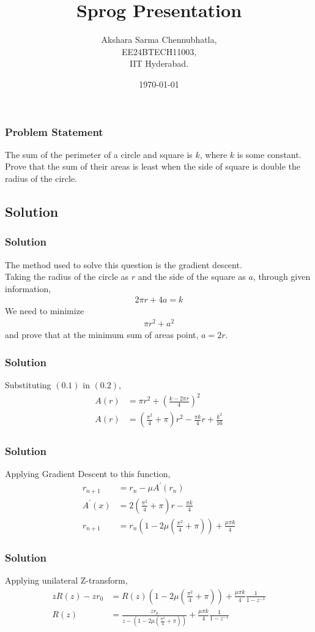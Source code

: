 \documentclass{beamer}
\title{Sprog Presentation}
\author{Akshara Sarma Chennubhatla,\\ EE24BTECH11003,\\IIT Hyderabad.\\}
\date{\today}
\providecommand{\brak}[1]{\ensuremath{\left(#1\right)}}
\theoremstyle{remark}
\numberwithin{equation}{section}
\begin{document}
		\begin{frame}
			\titlepage
		\end{frame}

		\begin{frame}
			\frametitle{Problem Statement}

The sum of the perimeter of a circle and square is $k$, where $k$ is some constant. Prove that the sum of their areas is least when the side of square is double the radius of the circle.

		\end{frame}
		\subsection{Solution}
		\begin{frame}
      \frametitle{Solution}
The method used to solve this question is the gradient descent.\\
Taking the radius of the circle as $r$ and the side of the square as $a$, through given information,
\begin{align}
	2\pi r + 4a = k
\end{align}
We need to minimize
\begin{align}
	\pi r^2 + a^2
\end{align}
and prove that at the minimum sum of areas point, $a = 2r$.\\
		\end{frame}
\begin{frame}
      \frametitle{Solution}
	Substituting $\brak{0.1}$ in $\brak{0.2}$,
\begin{align}
	A\brak{r} &= \pi r^2 + \brak{\frac{k - 2\pi r}{4}}^2\\
	A\brak{r} &= \brak{\frac{\pi^2}{4} + \pi}r^2 - \frac{\pi k}{4}r + \frac{k^2}{16}
\end{align}
\end{frame}
		\begin{frame}
      \frametitle{Solution}
			Applying Gradient Descent to this function,
\begin{align}
	r_{n+1} &= r_n - \mu A^\prime\brak{r_n}\\
	A^\prime\brak{x} &= 2\brak{\frac{\pi^2}{4} + \pi}r - \frac{\pi k}{4}\\
	r_{n+1} &= r_n\brak{1 - 2\mu\brak{\frac{\pi^2}{4} + \pi}} + \frac{\mu\pi k}{4}
\end{align}
		\end{frame}
		\begin{frame}
      \frametitle{Solution}
			Applying unilateral Z-transform,
\begin{align}
	zR\brak{z} - zr_0 &= R\brak{z}\brak{1 - 2\mu\brak{\frac{\pi^2}{4} + \pi}} + \frac{\mu\pi k}{4} \frac{1}{1 - z^{-1}}\\
	R\brak{z} &= \frac{zr_0}{z - \brak{1 - 2\mu\brak{\frac{\pi^2}{4} + \pi}}} + \frac{\mu\pi k}{4} \frac{1}{1 - z^{-1}}
\end{align}
		\end{frame}
\end{document}
